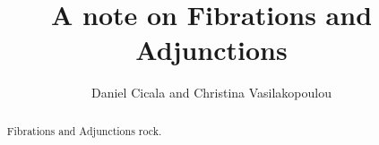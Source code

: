 \title{A note on Fibrations and Adjunctions}

\author{Daniel Cicala and Christina Vasilakopoulou} 
\address{update departments}

\begin{abstract}
Fibrations and Adjunctions rock.
\end{abstract}

\maketitle
